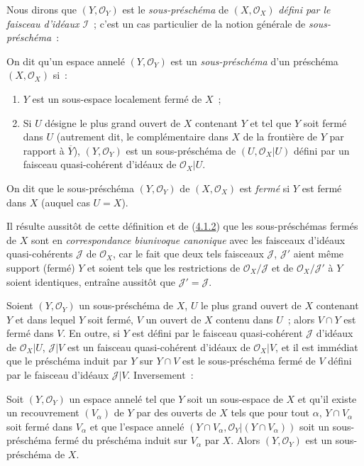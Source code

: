 Nous dirons que $(Y,\mathscr{O}_Y)$ est le \emph{sous-préschéma} de
$(X,\mathscr{O}_X)$ \emph{défini par le faisceau d'idéaux $\mathscr{I}$}~;
c'est un cas particulier de la notion générale de \emph{sous-préschéma}~:

\begin{definition}[4.1.3]
\label{I.4.1.3-fr}
On dit qu'un espace annelé $(Y,\mathscr{O}_Y)$ est un
\emph{sous-préschéma} d'un préschéma $(X,\mathscr{O}_X)$ si~:
\begin{enumerate}
  \item[$1^\circ$] $Y$ est un sous-espace localement fermé de $X$~;
  \item[$2^\circ$] Si $U$ désigne le plus grand ouvert de $X$ contenant $Y$
  et tel que $Y$ soit fermé dans $U$ (autrement dit, le complémentaire dans
  $X$ de la frontière de $Y$ par rapport à $\overline{Y}$),
  $(Y,\mathscr{O}_Y)$ est un sous-préschéma de
  $(U,\mathscr{O}_X|U)$ défini par un faisceau quasi-cohérent d'idéaux de
  $\mathscr{O}_X|U$.
\end{enumerate}
On dit que le sous-préschéma $(Y,\mathscr{O}_Y)$ de $(X,\mathscr{O}_X)$ est
\emph{fermé} si $Y$ est fermé dans $X$ (auquel cas $U=X$).
\end{definition}

Il résulte aussitôt de cette définition et de
(\hyperref[I.4.1.2-fr]{4.1.2}) que les sous-préschémas fermés de $X$ sont en
\emph{correspondance biunivoque canonique} avec les faisceaux d'idéaux
quasi-cohérents $\mathscr{J}$ de $\mathscr{O}_X$, car le fait que deux tels
faisceaux $\mathscr{J}$, $\mathscr{J}'$ aient même support (fermé) $Y$ et
soient tels que les restrictions de $\mathscr{O}_X/\mathscr{J}$ et de
$\mathscr{O}_X/\mathscr{J}'$ à $Y$ soient identiques, entraîne aussitôt que
$\mathscr{J}'=\mathscr{J}$.

\begin{env}[4.1.4]
\label{I.4.1.4-fr}
Soient $(Y,\mathscr{O}_Y)$ un sous-préschéma de $X$, $U$ le plus grand ouvert
de $X$ contenant $Y$ et dans lequel $Y$ soit fermé, $V$ un ouvert de $X$
contenu dans $U$~; alors $V\cap Y$ est fermé dans $V$. En outre, si $Y$ est
défini par le faisceau quasi-cohérent $\mathscr{J}$ d'idéaux de
$\mathscr{O}_X|U$, $\mathscr{J}|V$ est un faisceau quasi-cohérent d'idéaux de
$\mathscr{O}_X|V$, et il est immédiat que le préschéma induit par $Y$ sur
$Y\cap V$ est le sous-préschéma fermé de $V$ défini par le faisceau d'idéaux
$\mathscr{J}|V$. Inversement~:
\end{env}

\begin{proposition}[4.1.5]
\label{I.4.1.5-fr}
Soit $(Y,\mathscr{O}_Y)$ un espace annelé tel que $Y$ soit un sous-espace de
$X$ et qu'il existe un recouvrement $(V_\alpha)$ de $Y$ par des ouverts de
$X$ tels que pour tout $\alpha$, $Y\cap V_\alpha$ soit fermé dans $V_\alpha$
et que l'espace annelé
$(Y\cap V_\alpha,\mathscr{O}_Y|(Y\cap V_\alpha))$ soit un sous-préschéma
fermé du préschéma induit sur $V_\alpha$ par $X$. Alors
$(Y,\mathscr{O}_Y)$ est un sous-préschéma de $X$.
\end{proposition}

